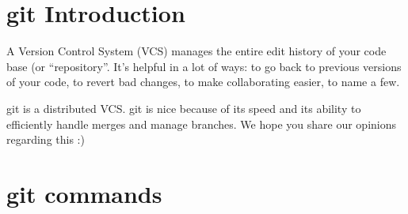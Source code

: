 \documentclass[12pt]{article}
\begin{document}
\section{git Introduction}
A Version Control System (VCS) manages the entire edit history of your code base (or ``repository''. It's helpful in a lot of ways: to go back to previous versions of your code, to revert bad changes, to make collaborating easier, to name a few.

git is a distributed VCS. git is nice because of its speed and its ability to efficiently handle merges and manage branches. We hope you share our opinions regarding this :)

\section{git commands}
\end{document}
